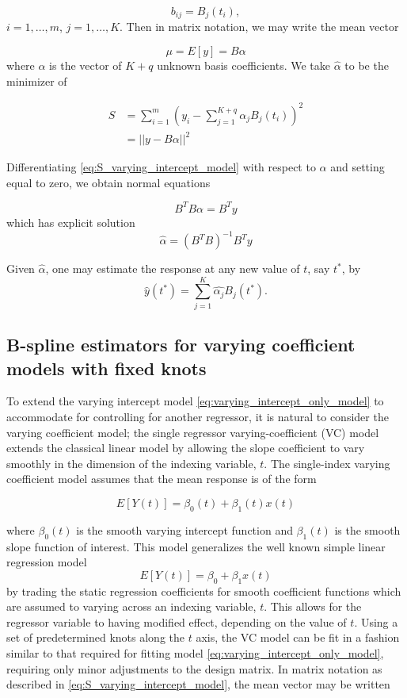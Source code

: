 \documentclass[12pt]{article}
\newcommand*\needsparaphrased{\color{red}}
\theoremstyle{definition}
\begin{document}
\[
b_{ij} = B_j\left(t_i\right),
\]
$i=1,\dots,m$, $j=1,\dots,K$. Then in matrix notation, we may write the mean vector

\[
\mu = E\left[y\right] = B\alpha
\]
\noindent
where $\alpha$ is the vector of $K+q$ unknown basis coefficients. We take $\hat{\alpha}$ to be the minimizer of 

\begin{align}
S &= \sum_{i=1}^m \left(y_i - \sum_{j=1}^{K+q} \alpha_j B_j\left(t_i\right) \right)^2 \nonumber\\
&=\vert \vert y - B\alpha \vert \vert^2 \label{eq:S_varying_intercept_model}
\end{align}

{\needsparaphrased{[not sure about the indexing on the basis function coefficients. If there are K basis functions, should I not only need K coefficients?]}}
Differentiating \ref{eq:S_varying_intercept_model} with respect to $\alpha$ and setting equal to zero, we obtain normal equations

\[
B^TB\alpha = B^Ty
\]
which has explicit solution
\[
\hat{\alpha} = \left(B^T B\right)^{-1}B^Ty
\]

Given $\hat{\alpha}$, one may estimate the response at any new value of $t$, say $t^*$, by 
\[
\hat{y}\left(t^*\right) = \sum_{j=1}^{K} \hat{\alpha_j}B_j\left(t^*\right).
\]

\subsection{B-spline estimators for varying coefficient models with fixed knots}

To extend the varying intercept model \ref{eq:varying_intercept_only_model} to accommodate for controlling for another regressor, it is natural to consider the varying coefficient model; the single regressor varying-coefficient (VC) model extends the classical linear model by allowing the slope coefficient to vary smoothly in the dimension of the indexing variable, $t$.  The single-index varying coefficient model assumes that the mean response is of the form

\begin{equation} \label{eq:simplest_VC_model_mean}
E\left[ Y\left(t\right) \right] = \beta_0\left(t\right) + \beta_1\left(t\right)x\left(t\right)
\end{equation}

where $\beta_0\left(t\right)$ is the smooth varying intercept function and $\beta_1\left(t\right)$ is the smooth slope function of interest. This model generalizes the well known simple linear regression model 
\[
E\left[Y\left(t\right)\right] = \beta_0 + \beta_1 x\left(t\right)
\]
by trading the static regression coefficients for smooth coefficient functions which are assumed to varying across an indexing variable, $t$. This allows for the regressor variable to having modified effect, depending on the value of $t$. Using a set of predetermined knots along the $t$ axis, the VC model can be fit in a fashion similar to that required for fitting model \ref{eq:varying_intercept_only_model}, requiring only minor adjustments to the design matrix. In matrix notation as described in \ref{eq:S_varying_intercept_model}, the mean vector may be written
\end{document}
